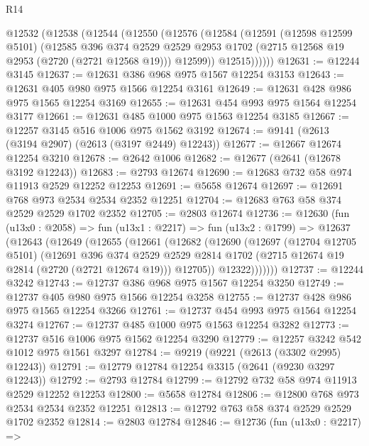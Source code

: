 \begin{lexlean}{R14}
\begin{coremodule}
    @12532
      (@12538
        (@12544
          (@12550
            (@12576
              (@12584
                (@12591
                  (@12598 @12599 @5101)
                  (@12585
                    @396
                    @374
                    @2529
                    @2529
                    @2953
                    @1702
                    (@2715 @12568 @19 @2953 (@2720 (@2721 @12568 @19)))
                    @12599))
                @12515))))))
@12631 := @12244 @3145
@12637 := @12631 @386 @968 @975 @1567 @12254 @3153
@12643 := @12631 @405 @980 @975 @1566 @12254 @3161
@12649 := @12631 @428 @986 @975 @1565 @12254 @3169
@12655 := @12631 @454 @993 @975 @1564 @12254 @3177
@12661 := @12631 @485 @1000 @975 @1563 @12254 @3185
@12667 := @12257 @3145 @516 @1006 @975 @1562 @3192
@12674 := @9141 (@2613 (@3194 @2907) (@2613 (@3197 @2449) @12243))
@12677 := @12667 @12674 @12254 @3210
@12678 := @2642 @1006
@12682 := @12677 (@2641 (@12678 @3192 @12243))
@12683 := @2793 @12674
@12690 := @12683 @732 @58 @974 @11913 @2529 @12252 @12253
@12691 := @5658 @12674
@12697 := @12691 @768 @973 @2534 @2534 @2352 @12251
@12704 := @12683 @763 @58 @374 @2529 @2529 @1702 @2352
@12705 := @2803 @12674
@12736 := @12630
    (fun (u13x0 : @2058) =>
    fun (u13x1 : @2217) =>
    fun (u13x2 : @1799) =>
    @12637
      (@12643
        (@12649
          (@12655
            (@12661
              (@12682
                (@12690
                  (@12697
                    (@12704 @12705 @5101)
                    (@12691
                      @396
                      @374
                      @2529
                      @2529
                      @2814
                      @1702
                      (@2715 @12674 @19 @2814 (@2720 (@2721 @12674 @19)))
                      @12705))
                  @12322)))))))
@12737 := @12244 @3242
@12743 := @12737 @386 @968 @975 @1567 @12254 @3250
@12749 := @12737 @405 @980 @975 @1566 @12254 @3258
@12755 := @12737 @428 @986 @975 @1565 @12254 @3266
@12761 := @12737 @454 @993 @975 @1564 @12254 @3274
@12767 := @12737 @485 @1000 @975 @1563 @12254 @3282
@12773 := @12737 @516 @1006 @975 @1562 @12254 @3290
@12779 := @12257 @3242 @542 @1012 @975 @1561 @3297
@12784 := @9219 (@9221 (@2613 (@3302 @2995) @12243))
@12791 := @12779 @12784 @12254 @3315 (@2641 (@9230 @3297 @12243))
@12792 := @2793 @12784
@12799 := @12792 @732 @58 @974 @11913 @2529 @12252 @12253
@12800 := @5658 @12784
@12806 := @12800 @768 @973 @2534 @2534 @2352 @12251
@12813 := @12792 @763 @58 @374 @2529 @2529 @1702 @2352
@12814 := @2803 @12784
@12846 := @12736
    (fun (u13x0 : @2217) =>

\end{coremodule}
\end{lexlean}
